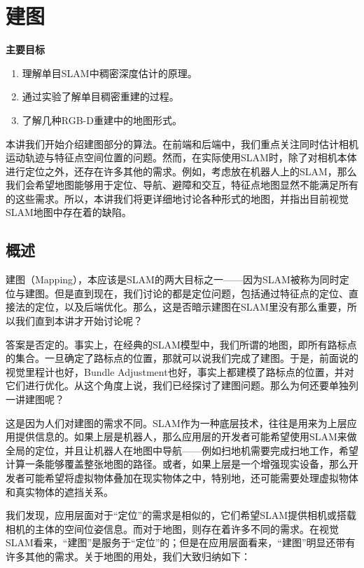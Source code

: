 \chapter{建图}
\begin{mdframed}  
	\textbf{主要目标}
	\begin{enumerate}[labelindent=0em,leftmargin=1.5em]
		\item 理解单目SLAM中稠密深度估计的原理。
		\item 通过实验了解单目稠密重建的过程。
		\item 了解几种RGB-D重建中的地图形式。
	\end{enumerate}
\end{mdframed}

本讲我们开始介绍建图部分的算法。在前端和后端中，我们重点关注同时估计相机运动轨迹与特征点空间位置的问题。然而，在实际使用SLAM时，除了对相机本体进行定位之外，还存在许多其他的需求。例如，考虑放在机器人上的SLAM，那么我们会希望地图能够用于定位、导航、避障和交互，特征点地图显然不能满足所有的这些需求。所以，本讲我们将更详细地讨论各种形式的地图，并指出目前视觉SLAM地图中存在着的缺陷。

\newpage
\section{概述}
建图（Mapping），本应该是SLAM的两大目标之一——因为SLAM被称为同时定位与建图。但是直到现在，我们讨论的都是定位问题，包括通过特征点的定位、直接法的定位，以及后端优化。那么，这是否暗示建图在SLAM里没有那么重要，所以我们直到本讲才开始讨论呢？

答案是否定的。事实上，在经典的SLAM模型中，我们所谓的地图，即所有路标点的集合。一旦确定了路标点的位置，那就可以说我们完成了建图。于是，前面说的视觉里程计也好，Bundle Adjustment也好，事实上都建模了路标点的位置，并对它们进行优化。从这个角度上说，我们已经探讨了建图问题。那么为何还要单独列一讲建图呢？

这是因为人们对建图的需求不同。SLAM作为一种底层技术，往往是用来为上层应用提供信息的。如果上层是机器人，那么应用层的开发者可能希望使用SLAM来做全局的定位，并且让机器人在地图中导航——例如扫地机需要完成扫地工作，希望计算一条能够覆盖整张地图的路径。或者，如果上层是一个增强现实设备，那么开发者可能希望将虚拟物体叠加在现实物体之中，特别地，还可能需要处理虚拟物体和真实物体的遮挡关系。

我们发现，应用层面对于“定位”的需求是相似的，它们希望SLAM提供相机或搭载相机的主体的空间位姿信息。而对于地图，则存在着许多不同的需求。在视觉SLAM看来，“建图”是服务于“定位”的；但是在应用层面看来，“建图”明显还带有许多其他的需求。关于地图的用处，我们大致归纳如下：

